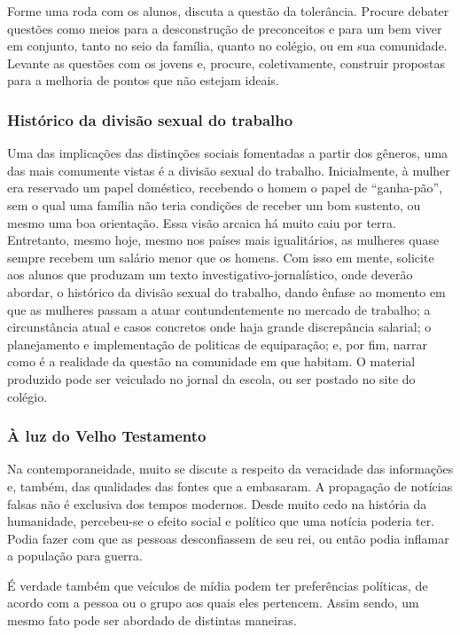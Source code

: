 \documentclass[12pt]{extarticle}
\begin{document}
Forme uma roda com os alunos, discuta a questão da tolerância. Procure
debater questões como meios para a desconstrução de preconceitos e para
um bem viver em conjunto, tanto no seio da família, quanto no colégio,
ou em sua comunidade. Levante as questões com os jovens e, procure,
coletivamente, construir propostas para a melhoria de pontos que não
estejam ideais.

\subsubsection{Histórico da divisão sexual do trabalho}

Uma das implicações das distinções sociais fomentadas a partir dos
gêneros, uma das mais comumente vistas é a divisão sexual do trabalho.
Inicialmente, à mulher era reservado um papel doméstico, recebendo o
homem o papel de ``ganha-pão'', sem o qual uma família não teria
condições de receber um bom sustento, ou mesmo uma boa orientação.
Essa visão arcaica há muito caiu por terra. Entretanto, mesmo hoje,
mesmo nos países mais igualitários, as mulheres quase sempre recebem
um salário menor que os homens. Com isso em mente, solicite aos alunos
que produzam um texto investigativo-jornalístico, onde deverão
abordar, o histórico da divisão sexual do trabalho, dando ênfase ao
momento em que as mulheres passam a atuar contundentemente no mercado
de trabalho; a circunstância atual e casos concretos onde haja grande
discrepância salarial; o planejamento e implementação de politicas de
equiparação; e, por fim, narrar como é a realidade da questão na
comunidade em que habitam. O material produzido pode ser veiculado no
jornal da escola, ou ser postado no site do colégio.

\subsubsection{À luz do Velho Testamento}

Na contemporaneidade, muito se discute a respeito da veracidade das
informações e, também, das qualidades das fontes que a embasaram. A
propagação de notícias falsas não é exclusiva dos tempos modernos.
Desde muito cedo na história da humanidade, percebeu-se o efeito
social e político que uma notícia poderia ter. Podia fazer com que as
pessoas desconfiassem de seu rei, ou então podia inflamar a população
para guerra.

É verdade também que veículos de mídia podem ter preferências políticas,
de acordo com a pessoa ou o grupo aos quais eles pertencem. Assim sendo,
um mesmo fato pode ser abordado de distintas maneiras.
\end{document}
